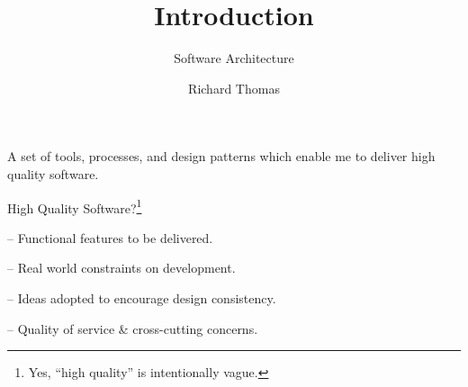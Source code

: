\documentclass{slide}
\title{Introduction}
\subtitle{Software Architecture}
\institute{University of Queensland}
\author{Richard Thomas}
\date{\week{1}}
\begin{document}
\maketitle








%
{A set of tools, processes, and design patterns which enable me to deliver high quality software.}


\begin{frame}{High Quality Software?\footnote{Yes, ``high quality'' is intentionally vague.}}
\Large{
\begin{description}
    \setlength\itemsep{0.5em}
    \item[Functional Requirements] -- Functional features to be delivered.
    \item[Constraints] -- Real world constraints on development.
    \item[Principles] -- Ideas adopted to encourage design consistency.
    \item[Quality Attributes] -- Quality of service \& cross-cutting concerns.
\end{description}
}
\end{frame}
\end{document}
